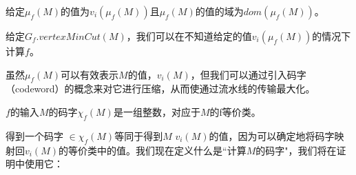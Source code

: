 给定$\mu_f(M)$的值为$v_i(\mu_f(M))$且$\mu_f(M)$的值的域为$dom(\mu_f(M))$。 %

\begin{lemma}
\label{lemma:M-to-mu}
给定$G_f.vertexMinCut(M)$，我们可以在不知道给定的值$v_i(\mu_f(M))$的情况下计算$f$。
\end{lemma}






虽然$\mu_f(M)$可以有效表示$M$的值，$v_i(M)$，但我们可以通过引入码字（codeword）的概念来对它进行压缩，从而使通过流水线的传输最大化。

\begin{definition} $f$的输入$M$的码字$\chi_f(M)$是一组整数，对应于$M$的f等价类。
\end{definition}

得到一个码字 $\in \chi_f(M)$等同于得到$M$ $v_i(M)$的值，因为可以确定地将码字映射回$v_i(M)$的等价类中的值。我们现在定义什么是``计算$M$的码字"，我们将在证明中使用它：

